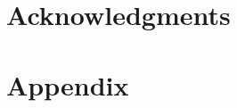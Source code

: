 \documentclass[11pt]{article}
\begin{document}
\section*{Acknowledgments}



\appendix

\section{Appendix}
\label{sec:appendix}

\end{document}
